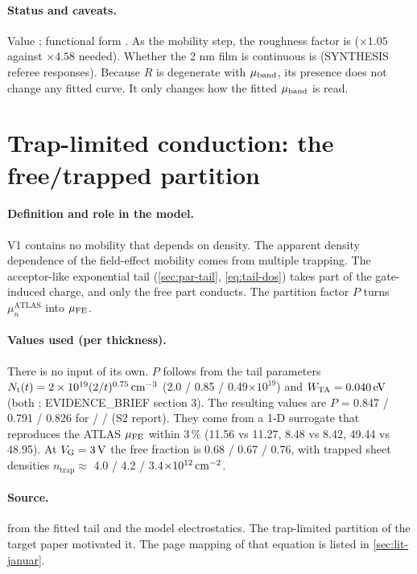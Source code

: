 \paragraph{Status and caveats.}
Value ; functional form . As the mobility step, the roughness factor is  ($\times1.05$ against $\times4.58$ needed). Whether the 2 nm film is continuous is  (SYNTHESIS referee responses). Because $R$ is degenerate with $\mu_{\mathrm{band}}$, its presence does not change any fitted curve. It only changes how the fitted $\mu_{\mathrm{band}}$ is read.

\section{Trap-limited conduction: the free/trapped partition}\label{sec:der-tlc}

\paragraph{Definition and role in the model.}
V1 contains no mobility that depends on density. The apparent density dependence of the field-effect mobility comes from multiple trapping. The acceptor-like exponential tail (\cref{sec:par-tail}, \cref{eq:tail-dos}) takes part of the gate-induced charge, and only the free part conducts. The partition factor $P$ turns $\mu_n^{\mathrm{ATLAS}}$ into $\mu_{\mathrm{FE}}$.

\paragraph{Values used (per thickness).}
There is no input of its own. $P$ follows from the tail parameters $N_{\mathrm{t}}(t)=2\times10^{19}(2/t)^{0.75}\,\mathrm{cm}^{-3}$ (2.0 / 0.85 / 0.49$\times10^{19}$) and $W_{\mathrm{TA}}=\SI{0.040}{eV}$ (both ; EVIDENCE\_BRIEF section 3). The resulting values are $P$ = 0.847 / 0.791 / 0.826 for  /  /  (S2 report). They come from a 1-D surrogate that reproduces the ATLAS $\mu_{\mathrm{FE}}$ within 3\,\% (11.56 vs 11.27, 8.48 vs 8.42, 49.44 vs 48.95). At $V_{\mathrm{G}}=\SI{3}{V}$ the free fraction is 0.68 / 0.67 / 0.76, with trapped sheet densities $n_{\mathrm{trap}}\approx$ 4.0 / 4.2 / 3.4$\times10^{12}\,\mathrm{cm}^{-2}$.

\paragraph{Source.}
 from the fitted tail and the model electrostatics. The trap-limited partition of the target paper \citep[p.~7, Eq.~5]{Januar2026} motivated it. The page mapping of that equation is listed in \cref{sec:lit-januar}.

